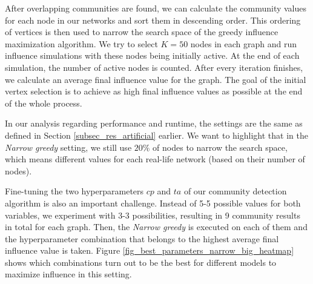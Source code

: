 \documentclass[pdflatex,sn-mathphys-num]{sn-jnl}
\begin{document}
After overlapping communities are found, we can calculate the community values for each node in our networks and sort them in descending order. This ordering of vertices is then used to narrow the search space of the greedy influence maximization algorithm. We try to select $K = 50$ nodes in each graph and run influence simulations with these nodes being initially active. At the end of each simulation, the number of active nodes is counted. After every iteration finishes, we calculate an average final influence value for the graph. The goal of the initial vertex selection is to achieve as high final influence values as possible at the end of the whole process.

In our analysis regarding performance and runtime, the settings are the same as defined in Section \ref{subsec_res_artificial} earlier. We want to highlight that in the \textit{Narrow greedy} setting, we still use $20\%$ of nodes to narrow the search space, which means different values for each real-life network (based on their number of nodes).

Fine-tuning the two hyperparameters $cp$ and $ta$ of our community detection algorithm is also an important challenge. Instead of 5-5 possible values for both variables, we experiment with 3-3 possibilities, resulting in 9 community results in total for each graph. Then, the \textit{Narrow greedy} is executed on each of them and the hyperparameter combination that belongs to the highest average final influence value is taken. Figure \ref{fig_best_parameters_narrow_big_heatmap} shows which combinations turn out to be the best for different models to maximize influence in this setting.
\end{document}
